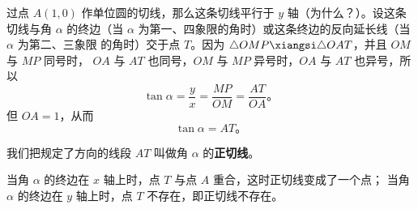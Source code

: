 过点 $A(1, 0)$ 作单位圆的切线，那么这条切线平行于 $y$ 轴（为什么？）。设这条切线与角 $\alpha$
的终边（当 $\alpha$ 为第一、四象限的角时）或这条终边的反向延长线（当 $\alpha$ 为第二、三象限
的角时）交于点 $T$。因为 $\triangle OMP \xiangsi \triangle OAT$，并且 $OM$ 与 $MP$ 同号时，
$OA$ 与 $AT$ 也同号，$OM$ 与 $MP$ 异号时，$OA$ 与 $AT$ 也异号，所以
$$\tan\alpha = \dfrac y x = \dfrac{MP}{OM} = \dfrac{AT}{OA} \text{。}$$
但 $OA = 1$，从而
$$\tan\alpha = AT \text{。}$$

我们把规定了方向的线段 $AT$ 叫做角 $\alpha$ 的\textbf{正切线}。

当角 $\alpha$ 的终边在 $x$ 轴上时，点 $T$ 与点 $A$ 重合，这时正切线变成了一个点；
当角 $\alpha$ 的终边在 $y$ 轴上时，点 $T$ 不存在，即正切线不存在。

\lianxi
\begin{xiaotis}

\begin{xiaoxiaotis}

    \vspace{0.5em}

\end{xiaoxiaotis}


\end{xiaotis}

